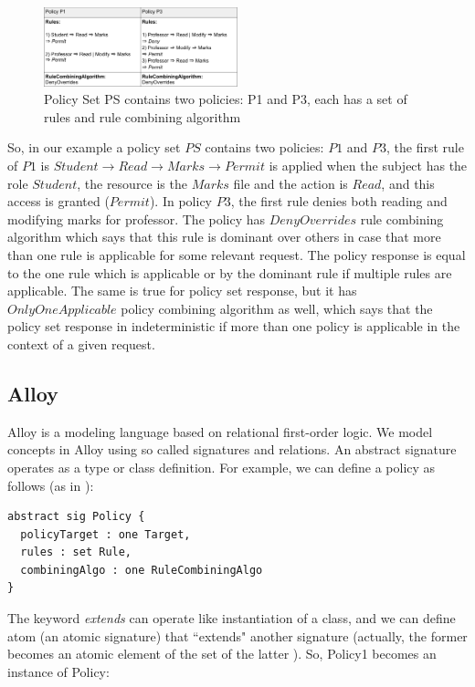 \documentclass{acm_proc_article-sp}
\begin{document}
\begin{figure}[h]
\includegraphics[width=0.5\textwidth]{policyset.png}
\caption{Policy Set PS contains two policies: P1 and P3, each has a set of rules and rule combining algorithm}    
  \label{fig:policyset}
\end{figure}

So, in our example a policy set $PS$ contains two policies: $P1$ and $P3$, the first rule of $P1$ is $Student \to Read \to Marks \to Permit $ is applied when the subject has the role $Student$, the resource is the $Marks$ file and the action is $Read$, and this access is granted ($Permit$). In policy $P3$, the first rule denies both reading and modifying marks for professor. The policy has $DenyOverrides$ rule combining algorithm which says that this rule is dominant over others in case that more than one rule is applicable for some relevant request. The policy response is equal to the one rule which is applicable or by the dominant rule if multiple rules are applicable. The same is true for policy set response, but it has $OnlyOneApplicable$ policy combining algorithm as well, which says that the policy set response in indeterministic if more than one policy is applicable in the context of a given request.

\subsection{Alloy}
Alloy \cite{jackson:alloy} is a modeling language based on relational first-order logic. We model concepts in Alloy using so called signatures and relations. An abstract signature operates as a type or class definition. For example, we can define a policy as follows (as in \cite{acp:alloy}):
 
 \begin{verbatim}
abstract sig Policy {
  policyTarget : one Target,
  rules : set Rule,
  combiningAlgo : one RuleCombiningAlgo
} 
\end{verbatim}

The keyword \textit{extends} can operate like instantiation of a class, and we can define atom (an atomic signature) that ``extends" another signature (actually, the former becomes an atomic element of the set of the latter \cite{jackson:alloy}). So, Policy1 becomes an instance of Policy:
\end{document}
